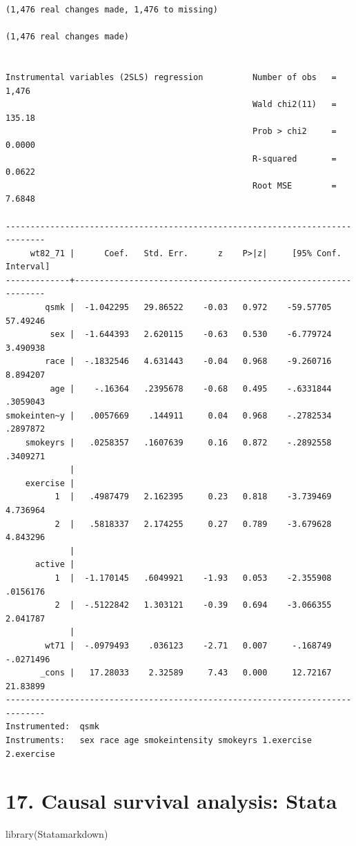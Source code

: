 \documentclass[
  10pt,
]{book}
\newenvironment{Shaded}{\begin{snugshade}}{\end{snugshade}}
\newcommand{\FunctionTok}[1]{\textcolor[rgb]{0.00,0.00,0.00}{#1}}
\newcommand{\NormalTok}[1]{#1}
\begin{document}
\begin{verbatim}
(1,476 real changes made, 1,476 to missing)

(1,476 real changes made)


Instrumental variables (2SLS) regression          Number of obs   =      1,476
                                                  Wald chi2(11)   =     135.18
                                                  Prob > chi2     =     0.0000
                                                  R-squared       =     0.0622
                                                  Root MSE        =     7.6848

------------------------------------------------------------------------------
     wt82_71 |      Coef.   Std. Err.      z    P>|z|     [95% Conf. Interval]
-------------+----------------------------------------------------------------
        qsmk |  -1.042295   29.86522    -0.03   0.972    -59.57705    57.49246
         sex |  -1.644393   2.620115    -0.63   0.530    -6.779724    3.490938
        race |  -.1832546   4.631443    -0.04   0.968    -9.260716    8.894207
         age |    -.16364   .2395678    -0.68   0.495    -.6331844    .3059043
smokeinten~y |   .0057669    .144911     0.04   0.968    -.2782534    .2897872
    smokeyrs |   .0258357   .1607639     0.16   0.872    -.2892558    .3409271
             |
    exercise |
          1  |   .4987479   2.162395     0.23   0.818    -3.739469    4.736964
          2  |   .5818337   2.174255     0.27   0.789    -3.679628    4.843296
             |
      active |
          1  |  -1.170145   .6049921    -1.93   0.053    -2.355908    .0156176
          2  |  -.5122842   1.303121    -0.39   0.694    -3.066355    2.041787
             |
        wt71 |  -.0979493    .036123    -2.71   0.007     -.168749   -.0271496
       _cons |   17.28033    2.32589     7.43   0.000     12.72167    21.83899
------------------------------------------------------------------------------
Instrumented:  qsmk
Instruments:   sex race age smokeintensity smokeyrs 1.exercise 2.exercise
\end{verbatim}

\hypertarget{causal-survival-analysis-stata}{%
\chapter*{17. Causal survival analysis: Stata}\label{causal-survival-analysis-stata}}

\begin{Shaded}
\begin{Highlighting}[]
\FunctionTok{library}\NormalTok{(Statamarkdown)}
\end{Highlighting}
\end{Shaded}
\end{document}
